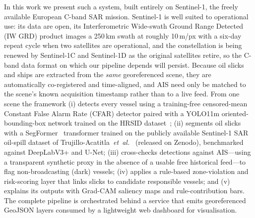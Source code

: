 \documentclass[a4paper,11pt]{article}
\begin{document}
In this work we present such a system, built entirely on Sentinel-1, the
freely available European C-band SAR mission. Sentinel-1 is well suited to
operational use: its data are open, its Interferometric Wide-swath Ground Range
Detected (IW GRD) product images a 250\,km swath at roughly 10\,m/px with a
six-day repeat cycle when two satellites are operational, and the constellation is
being renewed by Sentinel-1C and Sentinel-1D as the original satellites retire, so
the C-band data format on which our pipeline depends will persist. Because oil slicks and ships are extracted from the
\emph{same} georeferenced scene, they are automatically co-registered and
time-aligned, and AIS need only be matched to the scene's known acquisition
timestamp rather than to a live feed. From one scene the framework (i) detects every
vessel using a training-free censored-mean Constant False Alarm Rate (CFAR) detector
paired with a YOLO11m oriented-bounding-box network trained on the HRSID
dataset~\cite{wei2020}; (ii) segments oil slicks with a SegFormer~\cite{xie2021}
transformer trained on the publicly available Sentinel-1 SAR oil-spill dataset of
Trujillo-Acatitla~\textit{et~al.}~\cite{trujillo2024} (released on Zenodo), benchmarked
against DeepLabV3+ and U-Net; (iii) cross-checks detections against AIS---using a
transparent synthetic proxy in the absence of a usable free historical feed---to flag
non-broadcasting (dark) vessels; (iv) applies a rule-based zone-violation and risk-scoring layer
that links slicks to candidate responsible vessels; and (v) explains its outputs with
Grad-CAM saliency maps and rule-contribution bars. The complete pipeline is
orchestrated behind a service that emits georeferenced GeoJSON layers consumed by a
lightweight web dashboard for visualisation.
\end{document}
